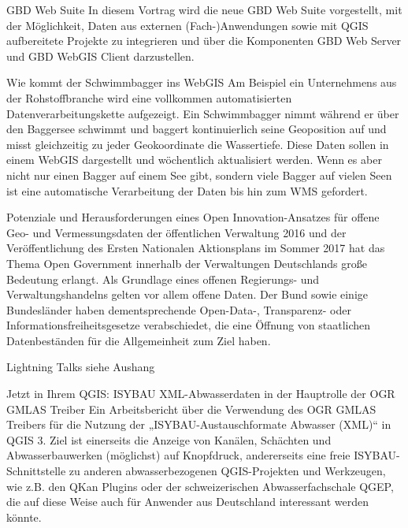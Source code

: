\renewcommand{\conferenceDay}{\donnerstag}

%
{GBD Web Suite}{}%
{In diesem Vortrag wird die neue GBD Web Suite vorgestellt, mit der Möglichkeit, Daten aus externen (Fach-)Anwendungen sowie mit QGIS aufbereitete Projekte zu integrieren und über die Komponenten GBD Web Server und GBD WebGIS Client darzustellen.}

%
{Wie kommt der Schwimmbagger ins WebGIS}%
{}%
{%
Am Beispiel ein Unternehmens aus der Rohstoffbranche wird eine vollkommen automatisierten Datenverarbeitungskette aufgezeigt. Ein Schwimmbagger nimmt während er über den Baggersee schwimmt und baggert kontinuierlich seine Geoposition auf und misst gleichzeitig zu jeder Geokoordinate die Wassertiefe. Diese Daten sollen in einem WebGIS dargestellt und wöchentlich aktualisiert werden. Wenn es aber nicht nur einen Bagger auf einem See gibt, sondern viele Bagger auf vielen Seen ist eine automatische Verarbeitung der Daten bis hin zum WMS gefordert.%
}


%
{Potenziale und Herausforderungen eines Open Innovation-Ansatzes für offene Geo- und Vermessungsdaten der öffentlichen Verwaltung  }%
{}%
{%
2016 und der Veröffentlichung des Ersten Nationalen Aktionsplans im Sommer 2017 hat das Thema Open Government innerhalb der Verwaltungen Deutschlands große Bedeutung erlangt. Als Grundlage eines offenen Regierungs- und Verwaltungshandelns gelten vor allem offene Daten. Der Bund sowie einige Bundesländer haben dementsprechende Open-Data-, Transparenz- oder Informationsfreiheitsgesetze verabschiedet, die eine Öffnung von staatlichen Datenbeständen für die Allgemeinheit zum Ziel haben.%
}

%
{Lightning Talks}%
{}%
{%
siehe Aushang%
}

%
{Jetzt in Ihrem QGIS: ISYBAU XML-Abwasserdaten}%
{in der Hauptrolle der OGR GMLAS Treiber}%
{%
Ein Arbeitsbericht über die Verwendung des OGR GMLAS Treibers für die Nutzung der „ISYBAU-Austauschformate Abwasser (XML)“ in QGIS 3. 
Ziel ist einerseits die Anzeige von Kanälen, Schächten und Abwasserbauwerken (möglichst) auf Knopfdruck, andererseits eine freie ISYBAU-Schnittstelle zu anderen abwasserbezogenen QGIS-Projekten und Werkzeugen, wie z.B. den QKan Plugins oder der schweizerischen Abwasserfachschale QGEP, die auf diese Weise auch für Anwender aus Deutschland interessant werden könnte.%
}

